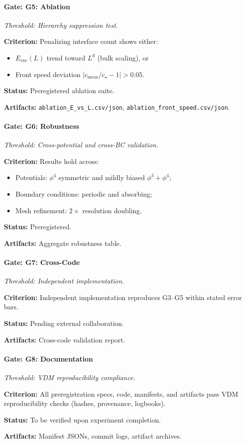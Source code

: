\documentclass{article}
\newenvironment{vdmgate}[2]{%
  \paragraph{Gate: #1} \emph{Threshold: #2.}%
  \par\noindent}{\medskip}
\begin{document}
\begin{vdmgate}{G5: Ablation}{Hierarchy suppression test}
\textbf{Criterion:} Penalizing interface count shows either:
\begin{itemize}
    \item $E_{\text{exc}}(L)$ trend toward $L^d$ (bulk scaling), or
    \item Front speed deviation $|c_{\text{meas}}/c_\star - 1|>0.05$.
\end{itemize}

\textbf{Status:} Preregistered ablation suite.

\textbf{Artifacts:} \texttt{ablation\_E\_vs\_L.csv/json}, \texttt{ablation\_front\_speed.csv/json}.
\end{vdmgate}

\begin{vdmgate}{G6: Robustness}{Cross-potential and cross-BC validation}
\textbf{Criterion:} Results hold across:
\begin{itemize}
    \item Potentials: $\phi^4$ symmetric and mildly biased $\phi^3+\phi^4$;
    \item Boundary conditions: periodic and absorbing;
    \item Mesh refinement: $2\times$ resolution doubling.
\end{itemize}

\textbf{Status:} Preregistered.

\textbf{Artifacts:} Aggregate robustness table.
\end{vdmgate}

\begin{vdmgate}{G7: Cross-Code}{Independent implementation}
\textbf{Criterion:} Independent implementation reproduces G3--G5 within stated error bars.

\textbf{Status:} Pending external collaboration.

\textbf{Artifacts:} Cross-code validation report.
\end{vdmgate}

\begin{vdmgate}{G8: Documentation}{VDM reproducibility compliance}
\textbf{Criterion:} All preregistration specs, code, manifests, and artifacts pass VDM reproducibility checks (hashes, provenance, logbooks).

\textbf{Status:} To be verified upon experiment completion.

\textbf{Artifacts:} Manifest JSONs, commit logs, artifact archives.
\end{vdmgate}
\end{document}
